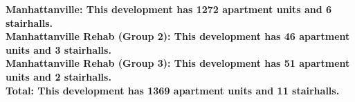 \bf{Manhattanville}: This development has 1272 apartment units and 6 stairhalls.\\\bf{Manhattanville Rehab (Group 2)}: This development has 46 apartment units and 3 stairhalls.\\\bf{Manhattanville Rehab (Group 3)}: This development has 51 apartment units and 2 stairhalls.\\\bf{Total}: This development has 1369 apartment units and 11 stairhalls.\\